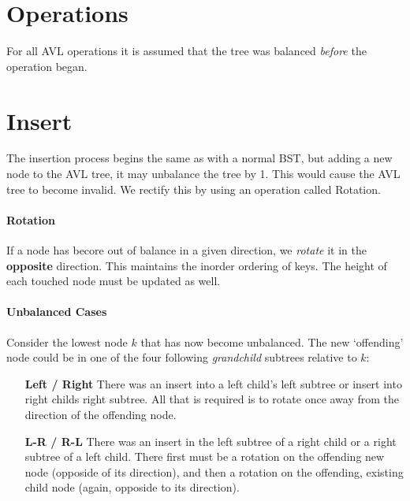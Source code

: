 \documentclass[12pt]{book}
\title{\coursetitle\linebreak\lecturename}
\author{\\Cain Susko\\ 
           \\ \\ \\
      Queen's University 
    \\School of Computing\\}
\begin{document}
\begin{titlepage}
        \maketitle
\end{titlepage}


{\small
\section*{Operations}
For all AVL operations it is assumed that the tree was balanced \textit{before} the operation began.

\section*{Insert}
The insertion process begins the same as with a normal BST, but adding a new node to the AVL tree, it 
may unbalance the tree by 1. This would cause the AVL tree to become invalid. We rectify this by using an operation
called Rotation.

\paragraph{Rotation}
If a node has becore out of balance in a given direction, we \textit{rotate} it in the \textbf{opposite} direction.
This maintains the inorder ordering of keys. The height of each touched node must be updated as well.

\paragraph{Unbalanced Cases}
Consider the lowest node $k$ that has now become unbalanced. The new `offending' node could be in one of the four
following \textit{grandchild} subtrees relative to $k$:
 \begin{enumerate}
        \item[\textbf{Left / Right}]
                There was an insert into a left child's left subtree or insert into right childs right subtree. 
                All that is required is to rotate once away from the direction of the offending node.
        \item[\textbf{L-R / R-L}] There was an insert in the left subtree of a right child or a right subtree of a 
                left child. There first must be a rotation on the offending new node 
                (opposide of its direction), and then a rotation on the offending, existing child node 
                (again, opposide to its direction).
\end{enumerate}

}
\end{document}
